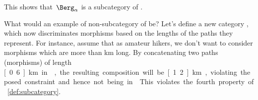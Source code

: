 This shows that~$\Berg_\alpha$ is a subcategory of \Berg.

What would an example of non-subcategory of \Berg be?
Let's define a new category \Berglazy, which now discriminates morphisms based on the lengths of the paths they represent.
For instance, assume that as amateur hikers, we don't want to consider morphisms which are more than \unit[1]{km} long.
By concatenating two paths (morphisms) of length \unit[0.6]{km} in \Berglazy, the resulting composition will be \unit[1.2]{km}, violating the posed constraint and hence not being in \Berglazy.
This violates the fourth property of \cref{def:subcategory}.









